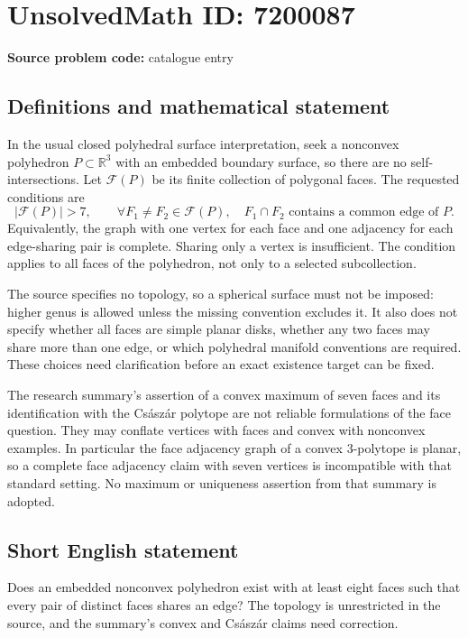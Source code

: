 \documentclass[11pt]{article}
\newcommand{\R}{\mathbb{R}}
\begin{document}
\section*{UnsolvedMath ID: 7200087}
\textbf{Source problem code:} catalogue entry
\subsection{Definitions and mathematical statement}
In the usual closed polyhedral surface interpretation, seek a nonconvex polyhedron \(P\subset\R^3\) with an embedded boundary surface, so there are no self-intersections. Let \(\mathcal F(P)\) be its finite collection of polygonal faces. The requested conditions are
\[
 |\mathcal F(P)|>7,\qquad
 \forall F_1\ne F_2\in\mathcal F(P),\quad
 F_1\cap F_2\text{ contains a common edge of }P.
\]
Equivalently, the graph with one vertex for each face and one adjacency for each edge-sharing pair is complete. Sharing only a vertex is insufficient. The condition applies to all faces of the polyhedron, not only to a selected subcollection.

The source specifies no topology, so a spherical surface must not be imposed: higher genus is allowed unless the missing convention excludes it. It also does not specify whether all faces are simple planar disks, whether any two faces may share more than one edge, or which polyhedral manifold conventions are required. These choices need clarification before an exact existence target can be fixed.

The research summary's assertion of a convex maximum of seven faces and its identification with the Cs\'asz\'ar polytope are not reliable formulations of the face question. They may conflate vertices with faces and convex with nonconvex examples. In particular the face adjacency graph of a convex 3-polytope is planar, so a complete face adjacency claim with seven vertices is incompatible with that standard setting. No maximum or uniqueness assertion from that summary is adopted.
\subsection{Short English statement}
Does an embedded nonconvex polyhedron exist with at least eight faces such that every pair of distinct faces shares an edge? The topology is unrestricted in the source, and the summary's convex and Cs\'asz\'ar claims need correction.
\end{document}
